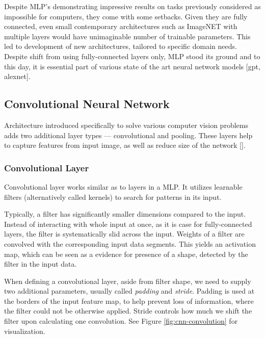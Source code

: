 Despite MLP's demonstrating impressive results on tasks previously considered as impossible for computers, they come with some setbacks. Given they are fully connected, even small contemporary architectures such as ImageNET with multiple layers would have unimaginable number of trainable parameters. This led to development of new architectures, tailored to specific domain needs. Despite shift from using fully-connected layers only, MLP stood its ground and to this day, it is essential part of various state of the art neural network models [gpt, alexnet].

\subsection*{Convolutional Neural Network}
Architecture introduced specifically to solve various computer vision problems adds two additional layer types --- convolutional and pooling. These layers help to capture features from input image, as well as reduce size of the network []. 


\subsubsection{Convolutional Layer}

Convolutional layer works similar as to layers in a MLP. It utilizes learnable filters (alternatively called kernels) to search for patterns in its input.

Typically, a filter has significantly smaller dimensions compared to the input. Instead of interacting with whole input at once, as it is case for fully-connected layers, the filter is systematically slid across the input. Weights of a filter are convolved with the corresponding input data segments. This yields an activation map, which can be seen as a evidence for presence of a shape, detected by the filter in the input data.

When defining a convolutional layer, aside from filter shape, we need to supply two additional parameters, usually called \emph{padding} and \emph{stride}. Padding is used at the borders of the input feature map, to help prevent loss of information, where the filter could not be otherwise applied. Stride controls how much we shift the filter upon calculating one convolution. See Figure \ref{fig:cnn-convolution} for visualization.

